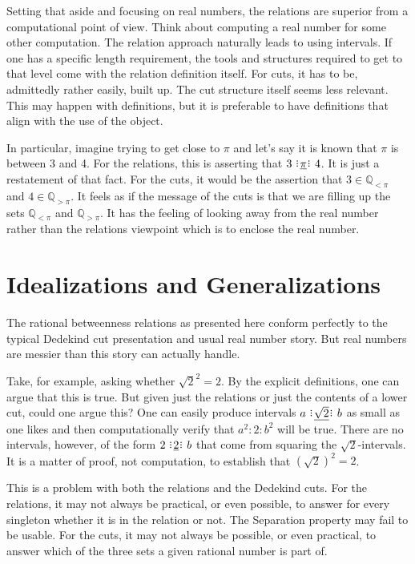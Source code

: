 \documentclass[12pt]{article}
\newcommand{\qcut}[2][x]{\ensuremath{\mathbb{Q}_{#2 #1}}}
\newcommand{\qlt}[1][x]{\qcut[#1]{<}}
\newcommand{\qgt}[1][x]{\qcut[#1]{>}}
\begin{document}
Setting that aside and focusing on real numbers, the relations are superior from a computational point of view. Think about computing a real number for some other computation. The relation approach naturally leads to using intervals. If one has a specific length requirement, the tools and structures required to get to that level come with the relation definition itself. For cuts, it has to be, admittedly rather easily, built up. The cut structure itself seems less relevant. This may happen with definitions, but it is preferable to have definitions that align with the use of the object. 

In particular, imagine trying to get close to $\pi$ and let's say it is known that $\pi$ is between 3 and 4. For the relations, this is asserting that $3 \xrel[\pi] 4$. It is just a restatement of that fact. For the cuts, it would be the assertion that $3 \in \qlt[\pi]$ and $4 \in \qgt[\pi]$. It feels as if the message of the cuts is that we are filling up the sets $\qlt[\pi]$ and $\qgt[\pi]$. It has the feeling of looking away from the real number rather than the relations viewpoint which is to enclose the real number. 


\section{Idealizations and Generalizations}

The rational betweenness relations as presented here conform perfectly to the typical Dedekind cut presentation and usual real number story. But real numbers are messier than this story can actually handle. 

Take, for example, asking whether $\sqrt{2}^2 = 2$. By the explicit definitions, one can argue that this is true. But given just the relations or just the contents of a lower cut, could one argue this? One can easily produce intervals $a \xrel[\sqrt{2}] b$ as small as one likes and then computationally verify that $a^2 : 2 :b^2$ will be true. There are no intervals, however, of the form $2 \xrel[2] b$ that come from squaring the $\sqrt{2}$-intervals. It is a matter of proof, not computation, to establish that $(\sqrt{2})^2 = 2$.

This is a problem with both the relations and the Dedekind cuts. For the relations, it may not always be practical, or even possible, to answer for every singleton whether it is in the relation or not. The Separation property may fail to be usable. For the cuts, it may not always be possible, or even practical,  to answer which of the three sets a given rational number is part of. 
\end{document}
